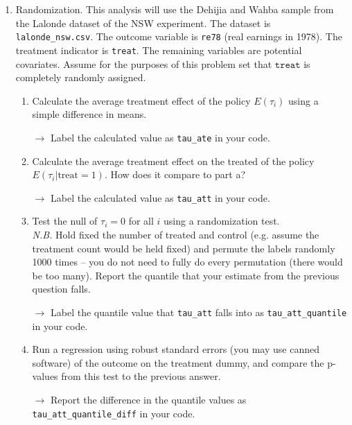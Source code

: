 \documentclass[11pt, a4paper]{article}
\begin{document}
\begin{enumerate}
\item Randomization. This analysis will use the Dehijia
  and Wahba sample from the Lalonde dataset of the NSW experiment. The dataset is
  \texttt{lalonde\_nsw.csv}. The outcome variable is \texttt{re78}
  (real earnings in 1978). The treatment indicator is
  \texttt{treat}. The remaining variables are potential covariates. Assume for the purposes of this problem set that $\texttt{treat}$ is completely randomly assigned. 
  \begin{enumerate}
  \item Calculate the average treatment effect of the policy
    $E(\tau_{i})$ using a simple difference in means. 

    \hspace{10pt} $\rightarrow$ Label the calculated value as \texttt{tau\_ate} in your code.
  \item Calculate the average treatment effect on the treated of the policy
    $E(\tau_{i}| \mathrm{treat} = 1)$. How does it compare to part a? 
   
    \hspace{10pt} $\rightarrow$ Label the calculated value as \texttt{tau\_att} in your code.
  \item Test the null of $\tau_{i} = 0$ for all $i$ using a
    randomization test. \\
    \emph{N.B.} Hold fixed the number of treated and control
    (e.g. assume the treatment count would be held fixed) and permute
    the labels randomly 1000 times -- you do not need to fully do
    every permutation (there would be too many). Report the quantile
    that your estimate from the previous question falls.

    \hspace{10pt} $\rightarrow$ Label the quantile value that \texttt{tau\_att} falls into as \texttt{tau\_att\_quantile} in your code.
  \item Run a regression using robust standard errors (you may use
    canned software) of the outcome on the treatment dummy, and
    compare the p-values from this test to the previous answer.

  \hspace{10pt} $\rightarrow$ Report the difference in the quantile values as \texttt{tau\_att\_quantile\_diff} in your code.
  \end{enumerate}  
\end{enumerate}
\end{document}

